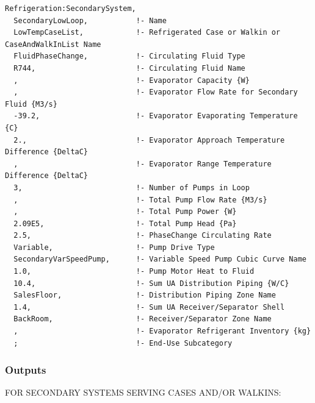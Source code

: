 \begin{lstlisting}
Refrigeration:SecondarySystem,
  SecondaryLowLoop,           !- Name
  LowTempCaseList,            !- Refrigerated Case or Walkin or CaseAndWalkInList Name
  FluidPhaseChange,           !- Circulating Fluid Type
  R744,                       !- Circulating Fluid Name
  ,                           !- Evaporator Capacity {W}
  ,                           !- Evaporator Flow Rate for Secondary Fluid {M3/s}
  -39.2,                      !- Evaporator Evaporating Temperature {C}
  2.,                         !- Evaporator Approach Temperature Difference {DeltaC}
  ,                           !- Evaporator Range Temperature Difference {DeltaC}
  3,                          !- Number of Pumps in Loop
  ,                           !- Total Pump Flow Rate {M3/s}
  ,                           !- Total Pump Power {W}
  2.09E5,                     !- Total Pump Head {Pa}
  2.5,                        !- PhaseChange Circulating Rate
  Variable,                   !- Pump Drive Type
  SecondaryVarSpeedPump,      !- Variable Speed Pump Cubic Curve Name
  1.0,                        !- Pump Motor Heat to Fluid
  10.4,                       !- Sum UA Distribution Piping {W/C}
  SalesFloor,                 !- Distribution Piping Zone Name
  1.4,                        !- Sum UA Receiver/Separator Shell
  BackRoom,                   !- Receiver/Separator Zone Name
  ,                           !- Evaporator Refrigerant Inventory {kg}
  ;                           !- End-Use Subcategory
\end{lstlisting}

\subsubsection{Outputs}\label{outputs-11-005}

FOR SECONDARY SYSTEMS SERVING CASES AND/OR WALKINS:

